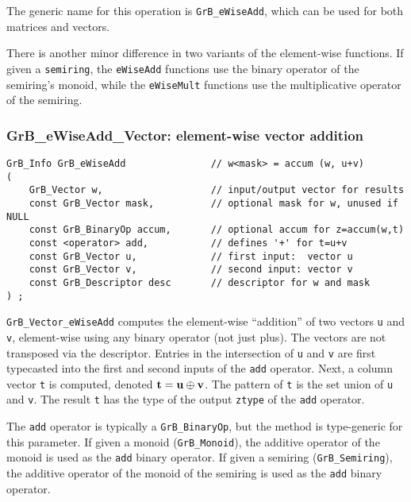 \documentclass[12pt]{article}
\begin{document}
The generic name for this operation is \verb'GrB_eWiseAdd', which can be used
for both matrices and vectors.

There is another minor difference in two variants of the element-wise
functions.  If given a \verb'semiring', the \verb'eWiseAdd' functions use the
binary operator of the semiring's monoid, while the \verb'eWiseMult' functions
use the multiplicative operator of the semiring.

\subsubsection{{\sf GrB\_eWiseAdd\_Vector:} element-wise vector addition}
\label{eWiseAdd_vector}

\begin{mdframed}[userdefinedwidth=6in]
{\footnotesize
\begin{verbatim}
GrB_Info GrB_eWiseAdd               // w<mask> = accum (w, u+v)
(
    GrB_Vector w,                   // input/output vector for results
    const GrB_Vector mask,          // optional mask for w, unused if NULL
    const GrB_BinaryOp accum,       // optional accum for z=accum(w,t)
    const <operator> add,           // defines '+' for t=u+v
    const GrB_Vector u,             // first input:  vector u
    const GrB_Vector v,             // second input: vector v
    const GrB_Descriptor desc       // descriptor for w and mask
) ;
\end{verbatim} } \end{mdframed}

\verb'GrB_Vector_eWiseAdd' computes the element-wise ``addition'' of two
vectors \verb'u' and \verb'v', element-wise using any binary operator (not just
plus).  The vectors are not transposed via the descriptor.  Entries in the
intersection of \verb'u' and \verb'v' are first typecasted into the first and
second inputs of the \verb'add' operator.  Next, a column vector \verb't' is
computed, denoted ${\bf t = u \oplus v}$.  The pattern of \verb't' is the set
union of \verb'u' and \verb'v'.  The result \verb't' has the type of the output
\verb'ztype' of the \verb'add' operator.

The \verb'add' operator is typically a \verb'GrB_BinaryOp', but the method is
type-generic for this parameter.  If given a monoid (\verb'GrB_Monoid'), the
additive operator of the monoid is used as the \verb'add' binary operator.  If
given a semiring (\verb'GrB_Semiring'), the additive operator of the monoid of
the semiring is used as the \verb'add' binary operator.
\end{document}
